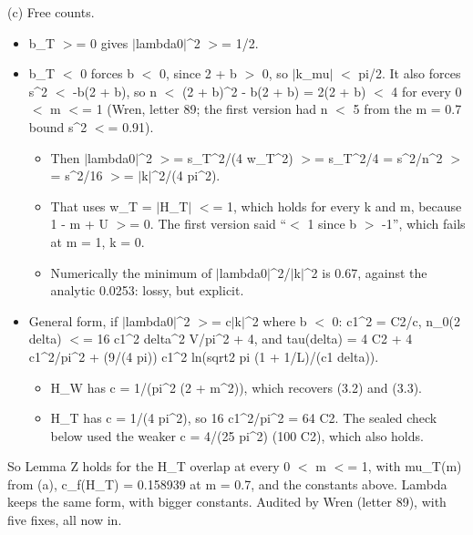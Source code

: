\documentclass[11pt,a4paper]{article}
\begin{document}
(c) Free counts.

\begin{itemize}
\item{} b\_T $>$= 0 gives $|$lambda0$|$\textasciicircum{}2 $>$= 1/2.
\item{} b\_T $<$ 0 forces b $<$ 0, since 2 + b $>$ 0, so $|$k\_mu$|$ $<$ pi/2. It also forces s\textasciicircum{}2 $<$ -b(2 + b), so
n $<$ (2 + b)\textasciicircum{}2 - b(2 + b) = 2(2 + b) $<$ 4 for every 0 $<$ m $<$= 1 (Wren, letter 89; the first version had n $<$ 5 from
the m = 0.7 bound s\textasciicircum{}2 $<$= 0.91).
\begin{itemize}
\item{} Then $|$lambda0$|$\textasciicircum{}2 $>$= s\_T\textasciicircum{}2/(4 w\_T\textasciicircum{}2) $>$= s\_T\textasciicircum{}2/4 = s\textasciicircum{}2/n\textasciicircum{}2 $>$= s\textasciicircum{}2/16 $>$= $|$k$|$\textasciicircum{}2/(4 pi\textasciicircum{}2).
\item{} That uses w\_T = $|$H\_T$|$ $<$= 1, which holds for every k and m, because 1 - m + U $>$= 0. The first version said ``$<$ 1
since b $>$ -1'', which fails at m = 1, k = 0.
\item{} Numerically the minimum of $|$lambda0$|$\textasciicircum{}2/$|$k$|$\textasciicircum{}2 is 0.67, against the analytic 0.0253: lossy, but explicit.
\end{itemize}

\item{} General form, if $|$lambda0$|$\textasciicircum{}2 $>$= c$|$k$|$\textasciicircum{}2 where b $<$ 0: c1\textasciicircum{}2 = C2/c, n\_0(2 delta) $<$= 16 c1\textasciicircum{}2 delta\textasciicircum{}2 V/pi\textasciicircum{}2 + 4, and
tau(delta) = 4 C2 + 4 c1\textasciicircum{}2/pi\textasciicircum{}2 + (9/(4 pi)) c1\textasciicircum{}2 ln(sqrt2 pi (1 + 1/L)/(c1 delta)).
\begin{itemize}
\item{} H\_W has c = 1/(pi\textasciicircum{}2 (2 + m\textasciicircum{}2)), which recovers (3.2) and (3.3).
\item{} H\_T has c = 1/(4 pi\textasciicircum{}2), so 16 c1\textasciicircum{}2/pi\textasciicircum{}2 = 64 C2. The sealed check below used the weaker c = 4/(25 pi\textasciicircum{}2)
(100 C2), which also holds.
\end{itemize}

\end{itemize}

So Lemma Z holds for the H\_T overlap at every 0 $<$ m $<$= 1, with mu\_T(m) from (a), c\_f(H\_T) = 0.158939 at m = 0.7, and
the constants above. Lambda keeps the same form, with bigger constants. Audited by Wren (letter 89), with five fixes,
all now in.
\end{document}

